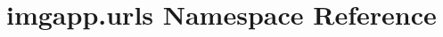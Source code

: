 \hypertarget{namespaceimgapp_1_1urls}{}\section{imgapp.\+urls Namespace Reference}
\label{namespaceimgapp_1_1urls}
